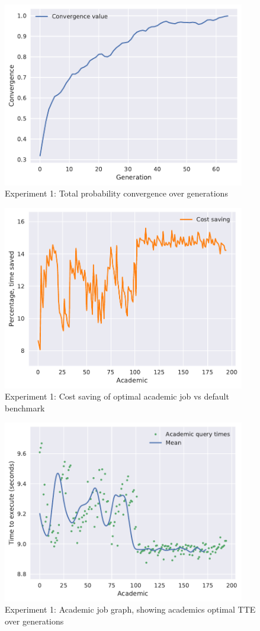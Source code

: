 \documentclass[a4paper,english]{report}
\begin{document}
	\begin{figure}[H]
		\centering
		\includegraphics[width=300pt]{runlogs/final5/1}
		\caption{Experiment 1: Total probability convergence over generations}
		\label{fig:final11}
	\end{figure}
	\begin{figure}[H]
		\centering
		\includegraphics[width=300pt]{runlogs/final5/2}
		\caption{Experiment 1: Cost saving of optimal academic job vs default benchmark}
		\label{fig:final12}
	\end{figure}
	\begin{figure}[H]
		\centering
		\includegraphics[width=300pt]{runlogs/final5/3}
		\caption{Experiment 1: Academic job graph, showing academics optimal TTE over generations}
		\label{fig:final13}
	\end{figure}
\end{document}
